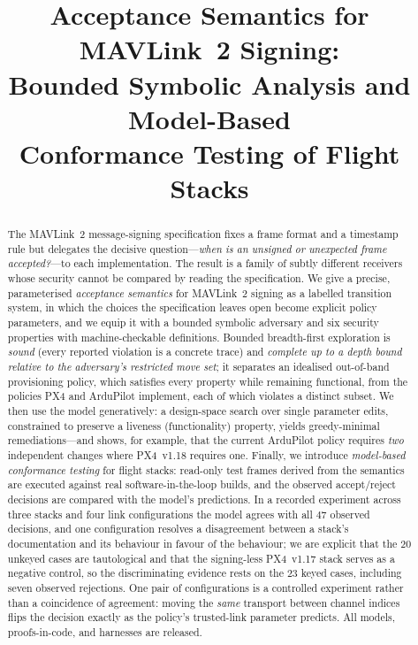 \documentclass[conference]{IEEEtran}
\begin{document}
\title{Acceptance Semantics for MAVLink~2 Signing:\\ Bounded Symbolic Analysis and Model-Based\\ Conformance Testing of Flight Stacks}

\author{
}
\maketitle

\begin{abstract}
The MAVLink~2 message-signing specification fixes a frame format and a timestamp
rule but delegates the decisive question---\emph{when is an unsigned or
unexpected frame accepted?}---to each implementation. The result is a family of
subtly different receivers whose security cannot be compared by reading the
specification. We give a precise, parameterised \emph{acceptance semantics} for
MAVLink~2 signing as a labelled transition system, in which the choices the
specification leaves open become explicit policy parameters, and we equip it with
a bounded symbolic adversary and six security properties with machine-checkable
definitions. Bounded breadth-first exploration is \emph{sound} (every reported
violation is a concrete trace) and \emph{complete up to a depth bound relative
to the adversary's restricted move set}; it
separates an idealised out-of-band provisioning policy, which satisfies every
property while remaining functional, from the policies PX4 and ArduPilot
implement, each of which violates a distinct subset. We then use the model
generatively: a design-space search over single parameter edits, constrained to
preserve a liveness (functionality) property, yields greedy-minimal
remediations---and shows, for example, that the current ArduPilot policy
requires \emph{two} independent changes where PX4~v1.18 requires one. Finally,
we introduce \emph{model-based conformance testing} for flight stacks: read-only
test frames derived from the semantics are executed against real
software-in-the-loop builds, and the observed accept/reject decisions are
compared with the model's predictions. In a recorded experiment across three
stacks and four link configurations the model agrees with all $47$ observed
decisions, and one configuration resolves a disagreement between a stack's
documentation and its behaviour in favour of the behaviour; we are explicit that the $20$ unkeyed cases are tautological and that
the signing-less PX4~v1.17 stack serves as a negative control, so the
discriminating evidence rests on the $23$ keyed cases, including seven observed
rejections. One pair of configurations is a controlled experiment rather than a
coincidence of agreement: moving the \emph{same} transport between channel
indices flips the decision exactly as the policy's trusted-link parameter
predicts. All
models, proofs-in-code, and harnesses are released.
\end{abstract}
\end{document}
